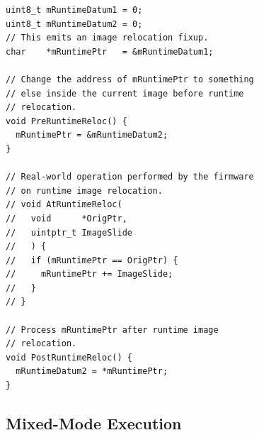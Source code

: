 \begin{lstfloat}[ht]
  \centering
  \begin{lstlisting}[style=c]
uint8_t mRuntimeDatum1 = 0;
uint8_t mRuntimeDatum2 = 0;
// This emits an image relocation fixup.
char    *mRuntimePtr   = &mRuntimeDatum1;

// Change the address of mRuntimePtr to something
// else inside the current image before runtime
// relocation.
void PreRuntimeReloc() {
  mRuntimePtr = &mRuntimeDatum2;
}

// Real-world operation performed by the firmware
// on runtime image relocation.
// void AtRuntimeReloc(
//   void      *OrigPtr,
//   uintptr_t ImageSlide
//   ) {
//   if (mRuntimePtr == OrigPtr) {
//     mRuntimePtr += ImageSlide;
//   }
// }

// Process mRuntimePtr after runtime image
// relocation.
void PostRuntimeReloc() {
  mRuntimeDatum2 = *mRuntimePtr;
}
  \end{lstlisting}
  \caption{Bug from Real-World UEFI Runtime Image Relocation.}
  \label{fig:real_uefi_rt_reloc}
  \caption*{Erroneous program assuming real-world \gls{UEFI} \gls{runtime-image-relocation}. This bug mirrors the fault from Figure~\ref{fig:native_uefi_rt_reloc}. Real-world \gls{UEFI} implementations only relocate values that remain unchanged~\cite{edk2}, which mitigates the previous fault. Before entering the runtime phase, we change \lstinline|mRuntimePtr| to point to \lstinline[style=c]|mRuntimeDatum2|. As its address is different from that of \lstinline[style=c]|mRuntimeDatum1|, the \gls{image-relocation-fixup} is not applied, even though the address is within the \gls{image} \gls{address-space}. After the \gls{runtime-image-relocation} has succeeded, we run some code that should effectively assign \lstinline|mRuntimeDatum2| to itself. However, due to the incorrect address of \lstinline|mRuntimePtr|, we are reading arbitrary memory. One could argue that according to the \gls{UEFI} specification, \lstinline|ConvertPointer()| should have been called on \lstinline|mRuntimePtr|, which resolves the bug~\cite{uefi-spec}. However, the vague wording about reapplying of \glspl{image-relocation-fixup} and the correct behaviour for unmodified pointers make the situation ambiguous.}
\end{lstfloat}

\subsection{Mixed-Mode Execution}
\label{sec:mixed-mode}

